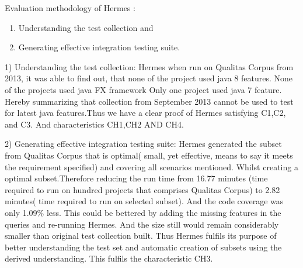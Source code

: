 \documentclass[authoryear,preprint]{sigplanconf}
\begin{document}
\begin{table*}[h]
	\centering
	\captionsetup{justification=centering}
	\caption{Characteristics available within each approach}
	\label{my-label}
\end{table*}

Evaluation methodology of Hermes : 
\begin{enumerate}
	\item Understanding the test collection and 
	\item Generating effective integration testing suite.
\end{enumerate}

1) Understanding the test collection:
Hermes when run on Qualitas Corpus from 2013, it was able to find out, that none of the project used java 8 features. None of the projects used java FX framework Only one project used java 7 feature. Hereby summarizing that collection from September 2013 cannot be used to test for latest java features.Thus we have a clear proof of Hermes satisfying C1,C2, and C3. And characteristics CH1,CH2 AND CH4.

2) Generating effective integration testing suite:
Hermes generated the subset from Qualitas Corpus that is optimal( small, yet effective, means to say it meets the requirement specified) and covering all scenarios mentioned. Whilst creating a optimal subset.Therefore reducing the run time from 16.77 minutes (time required to run on hundred projects that comprises Qualitas Corpus) to 2.82 minutes( time required to run on selected subset). And the code coverage was only 1.09\% less. This could be bettered by adding the missing features in the queries and re-running Hermes. And the size still would remain considerably smaller than original test collection built. Thus Hermes fulfils its purpose of better understanding the test set and automatic creation of subsets using the derived understanding. This fulfils the characteristic CH3.
\end{document}
